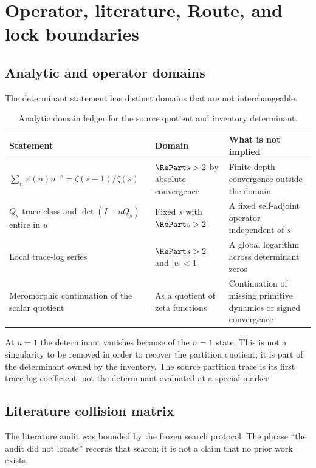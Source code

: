 \section{Operator, literature, Route, and lock boundaries}
\label{app:boundaries}

\subsection{Analytic and operator domains}

The determinant statement has distinct domains that are not interchangeable.

\begin{table}[H]
\centering
\caption{Analytic domain ledger for the source quotient and inventory
determinant.}
\small
\begin{tabularx}{\textwidth}{@{}P{.27\textwidth}P{.23\textwidth}Y@{}}
\toprule
Statement & Domain & What is not implied \\
\midrule
$\sum_n\varphi(n)n^{-s}=\zeta(s-1)/\zeta(s)$
& $\RePart s>2$ by absolute convergence
& Finite-depth convergence outside the domain \\
$Q_s$ trace class and $\det(I-uQ_s)$ entire in $u$
& Fixed $s$ with $\RePart s>2$
& A fixed self-adjoint operator independent of $s$ \\
Local trace-log series
& $\RePart s>2$ and $|u|<1$
& A global logarithm across determinant zeros \\
Meromorphic continuation of the scalar quotient
& As a quotient of zeta functions
& Continuation of missing primitive dynamics or signed convergence \\
\bottomrule
\end{tabularx}
\end{table}

At $u=1$ the determinant vanishes because of the $n=1$ state.  This is not a
singularity to be removed in order to recover the partition quotient; it is
part of the determinant owned by the inventory.  The source partition trace
is its first trace-log coefficient, not the determinant evaluated at a
special marker.

\subsection{Literature collision matrix}

The literature audit was bounded by the frozen search protocol.  The phrase
``the audit did not locate'' records that search; it is not a claim that no
prior work exists.

